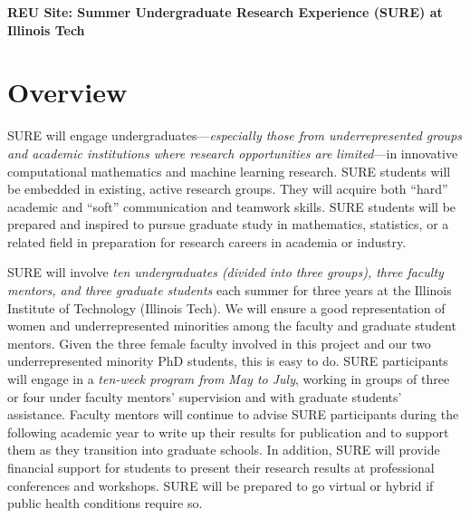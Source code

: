\documentclass[11pt]{NSFamsart}
\begin{document}

\begin{center}
\Large 
\textbf{REU Site: Summer Undergraduate Research Experience (SURE) at Illinois Tech}
\end{center}



\section{Overview} 
\label{sec:overview}
SURE will engage undergraduates---\emph{especially those from underrepresented groups and academic institutions where research opportunities are limited}---in innovative computational mathematics and machine learning research.  SURE students will  be embedded in existing, active research groups. They will acquire both ``hard'' academic and ``soft'' communication and teamwork skills.  SURE students will be prepared and inspired to pursue graduate study in mathematics, statistics, or a related field in preparation for research careers in academia or industry.

SURE will involve \emph{ten undergraduates (divided into three groups), three faculty mentors, and three graduate students} each summer for three years at the Illinois Institute of Technology (Illinois Tech). We will ensure a good representation of women and underrepresented minorities among the faculty and graduate student mentors. Given the three female faculty involved in this project and 
our two underrepresented minority PhD students, this is easy to do. SURE participants will engage in a \emph{ten-week program from May to July}, working in groups of three or four under faculty mentors' supervision and with graduate students' assistance. Faculty mentors will continue to advise SURE participants during the following academic year to write up their results for publication and to support them as they transition into graduate schools. In addition, SURE will provide financial support for students to present their research results at professional conferences and workshops.
SURE will be prepared to go virtual or hybrid if public health conditions require so.
\end{document}
